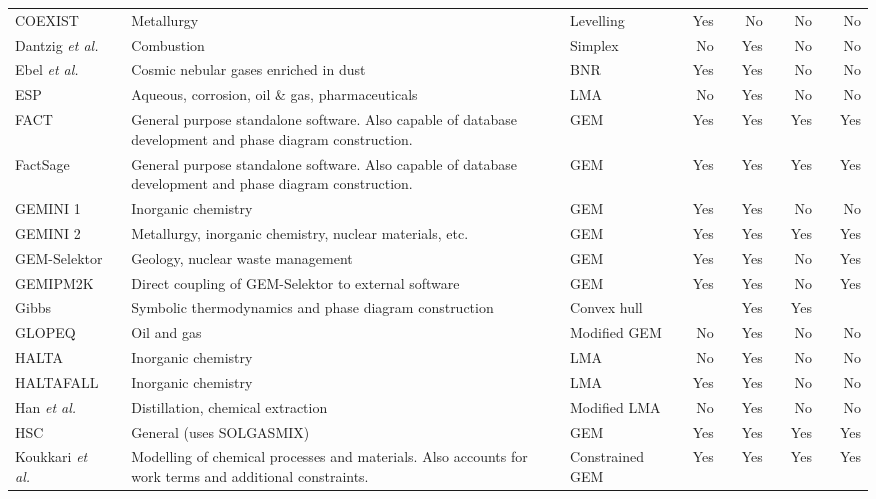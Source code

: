 \begin{landscape}
\begin{longtable}{@{}p{}cp{}clcrcrcrcr@{}}
		COEXIST \cite{Ahafat:1992aa} && {Metallurgy} && Levelling && Yes && No && No && No\\
		Dantzig \textit{et al.} \cite{Dantzig:1958aa}&& {Combustion} && Simplex && No && Yes && No && No\\
		Ebel \textit{et al.} \cite{Ebel:2000aa}&& {Cosmic nebular gases enriched in dust} && BNR && Yes && Yes && No && No\\
		ESP \cite{Rafal:2003aa}&& {Aqueous, corrosion, oil \& gas, pharmaceuticals} && LMA && No && Yes && No && No\\
		FACT \cite{Thompson83} && {General purpose standalone software. Also capable of database development and phase diagram construction.} && GEM && Yes && Yes && Yes && Yes\\
		FactSage \cite{Bale83} && {General purpose standalone software. Also capable of database development and phase diagram construction.} && GEM && Yes && Yes && Yes && Yes\\
		GEMINI 1 \cite{Cheynet09} && {Inorganic chemistry} && GEM && Yes && Yes && No && No\\
		GEMINI 2 \cite{Cheynet09} && {Metallurgy, inorganic chemistry, nuclear materials, etc.} && GEM && Yes && Yes && Yes && Yes\\ 
		GEM-Selektor \cite{Karpov:aa}&& {Geology, nuclear waste management} && GEM && Yes && Yes && No && Yes\\
		GEMIPM2K \cite{Karpov:aa} && {Direct coupling of GEM-Selektor to external software} && GEM && Yes && Yes && No && Yes\\
		Gibbs \cite{COOL2010393}&& {Symbolic thermodynamics and phase diagram construction} && Convex hull && {} && Yes && Yes && {}\\
		GLOPEQ \cite{MCDONALD19971} && {Oil and gas} && Modified GEM && No && Yes && No && No\\
		HALTA \cite{Sillen:1962aa} && {Inorganic chemistry} && LMA && No && Yes && No && No\\
		HALTAFALL \cite{INGRI19671261} && {Inorganic chemistry} && LMA && Yes && Yes && No && No\\
		Han \textit{et al.} \cite{HAN1998897}&& {Distillation, chemical extraction} && Modified LMA && No && Yes && No && No\\
		HSC \cite{HSCSoftware:aa} && {General (uses SOLGASMIX)} && GEM && Yes && Yes && Yes && Yes\\
		Koukkari \textit{et al.} \cite{KOUKKARI200618} && {Modelling of chemical processes and materials. Also accounts for work terms and additional constraints.} && Constrained GEM && Yes && Yes && Yes && Yes\\

\end{longtable}
\end{landscape}
